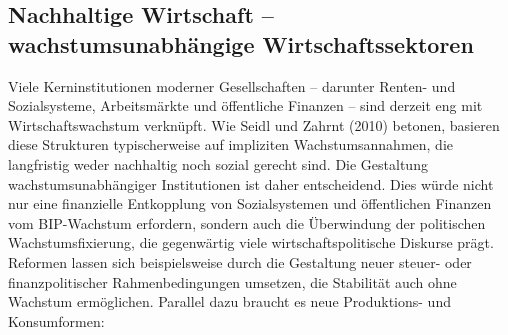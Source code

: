 \documentclass[
  nswissgerman,
  a4paper,
  openany]{book}
\begin{document}
\subsection{Nachhaltige Wirtschaft -- wachstumsunabhängige
Wirtschaftssektoren}\label{nachhaltige-wirtschaft-wachstumsunabhuxe4ngige-wirtschaftssektoren}

Viele Kerninstitutionen moderner Gesellschaften -- darunter Renten- und
Sozialsysteme, Arbeitsmärkte und öffentliche Finanzen -- sind derzeit
eng mit Wirtschaftswachstum verknüpft. Wie Seidl und Zahrnt (2010)
betonen, basieren diese Strukturen typischerweise auf impliziten
Wachstumsannahmen, die langfristig weder nachhaltig noch sozial gerecht
sind. Die Gestaltung wachstumsunabhängiger Institutionen ist daher
entscheidend. Dies würde nicht nur eine finanzielle Entkopplung von
Sozialsystemen und öffentlichen Finanzen vom BIP-Wachstum erfordern,
sondern auch die Überwindung der politischen Wachstumsfixierung, die
gegenwärtig viele wirtschaftspolitische Diskurse prägt. Reformen lassen
sich beispielsweise durch die Gestaltung neuer steuer- oder
finanzpolitischer Rahmenbedingungen umsetzen, die Stabilität auch ohne
Wachstum ermöglichen. Parallel dazu braucht es neue Produktions- und
Konsumformen:
\end{document}
